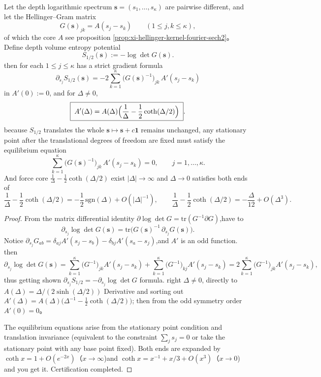 \begin{proposition}\label{prop:xi-hellinger-gram-first-variation-equilibrium}
Let the depth logarithmic spectrum \(\mathbf s=(s_1,\dots,s_\kappa)\) are pairwise different, and let the Hellinger--Gram matrix
\[
G(\mathbf s)_{jk}=A(s_j-s_k)\qquad(1\le j,k\le \kappa),
\]
of which the core \(A\) see proposition \ref{prop:xi-hellinger-kernel-fourier-sech2}。
Define depth volume entropy potential
\[
S_{1/2}(\mathbf s):=-\log\det G(\mathbf s).
\]
then for each \(1\le j\le \kappa\) has a strict gradient formula
\[
\boxed{\;
\partial_{s_j}S_{1/2}(\mathbf s)
=-2\sum_{k=1}^{\kappa}\bigl(G(\mathbf s)^{-1}\bigr)_{jk}\,A'(s_j-s_k)\;}
\]
in \(A'(0):=0\), and for \(\Delta\neq 0\),
\[
\boxed{\;
A'(\Delta)
=A(\Delta)\Bigl(\frac{1}{\Delta}-\frac12\coth(\Delta/2)\Bigr)\; }.
\]
because \(S_{1/2}\) translates the whole \(\mathbf s\mapsto \mathbf s+c\mathbf 1\) remains unchanged, any stationary point after the translational degrees of freedom are fixed must satisfy the equilibrium equation
\[
\sum_{k=1}^{\kappa}\bigl(G(\mathbf s)^{-1}\bigr)_{jk}\,A'(s_j-s_k)=0,\qquad j=1,\dots,\kappa.
\]
And force core \(\frac{1}{\Delta}-\frac12\coth(\Delta/2)\) exist \(|\Delta|\to\infty\) and \(\Delta\to 0\) satisfies both ends of
\[
\frac{1}{\Delta}-\frac12\coth(\Delta/2)= -\frac12\,\mathrm{sgn}(\Delta)+O(|\Delta|^{-1}),
\qquad
\frac{1}{\Delta}-\frac12\coth(\Delta/2)=-\frac{\Delta}{12}+O(\Delta^3).
\]
\end{proposition}
\begin{proof}
From the matrix differential identity \(\partial\log\det G=\mathrm{tr}(G^{-1}\partial G)\),have to
\[
\partial_{s_j}\log\det G(\mathbf s)=\mathrm{tr}\bigl(G(\mathbf s)^{-1}\,\partial_{s_j}G(\mathbf s)\bigr).
\]
Notice \(\partial_{s_j}G_{ab}=\delta_{aj}A'(s_j-s_b)-\delta_{bj}A'(s_a-s_j)\),and \(A'\) is an odd function.
then
\[
\partial_{s_j}\log\det G(\mathbf s)
=\sum_{k=1}^{\kappa}\bigl(G^{-1}\bigr)_{jk}A'(s_j-s_k)
+\sum_{k=1}^{\kappa}\bigl(G^{-1}\bigr)_{kj}A'(s_j-s_k)
=2\sum_{k=1}^{\kappa}\bigl(G^{-1}\bigr)_{jk}A'(s_j-s_k),
\]
thus getting shown \(\partial_{s_j}S_{1/2}=-\partial_{s_j}\log\det G\) formula.
right \(\Delta\neq 0\), directly to \(A(\Delta)=\Delta/(2\sinh(\Delta/2))\) Derivative and sorting out
\(
A'(\Delta)=A(\Delta)\bigl(\Delta^{-1}-\tfrac12\coth(\Delta/2)\bigr)
\); then from the odd symmetry order \(A'(0)=0\)。
\par
The equilibrium equations arise from the stationary point condition and translation invariance (equivalent to the constraint \(\sum_j s_j=0\) or take the stationary point with any base point fixed).
Both ends are expanded by \(\coth x=1+O(e^{-2x})\)（\(x\to\infty\))and
\(\coth x=x^{-1}+x/3+O(x^3)\)（\(x\to 0\)) and you get it. Certification completed.
\end{proof}

